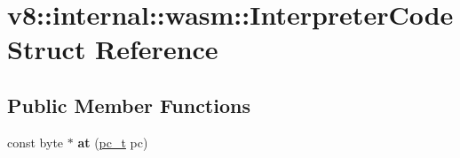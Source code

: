 \hypertarget{structv8_1_1internal_1_1wasm_1_1InterpreterCode}{}\section{v8\+:\+:internal\+:\+:wasm\+:\+:Interpreter\+Code Struct Reference}
\label{structv8_1_1internal_1_1wasm_1_1InterpreterCode}
\subsection*{Public Member Functions}
\begin{DoxyCompactItemize}
\item 
\mbox{\label{structv8_1_1internal_1_1wasm_1_1InterpreterCode_a8f1f6995c4bbe11ef13dd9d30a3585af}} 
const byte $\ast$ {\bfseries at} (\mbox{\hyperlink{classsize__t}{pc\+\_\+t}} pc)
\end{DoxyCompactItemize}
